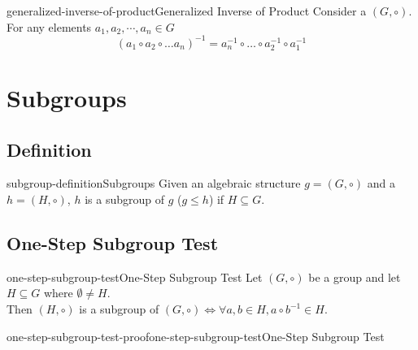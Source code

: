 \documentclass[preview]{standalone}
\begin{document}
\begin{snippettheorem}{generalized-inverse-of-product}{Generalized Inverse of Product}
    Consider a \group \((G, \circ)\). For any elements \(a_1,a_2,\cdots,a_n \in G\)
    \[
        (a_1 \circ a_2 \circ \dots a_n)^{-1}
        = a_n^{-1} \circ \dots \circ a_2^{-1} \circ a_1^{-1}
    \]
\end{snippettheorem}

\section{Subgroups}

\subsection{Definition}

\begin{snippetdefinition}{subgroup-definition}{Subgroups}
    Given an algebraic structure \(g=(G, \circ)\) and a \group \(h=(H, \circ)\), \(h\)
    is a subgroup of \(g\) (\(g \leq h\)) if \(H \subseteq G\).
\end{snippetdefinition}

\subsection{One-Step Subgroup Test}

\begin{snippettheorem}{one-step-subgroup-test}{One-Step Subgroup Test}
    Let \((G, \circ)\) be a group and let \(H \subseteq G\) where \(\emptyset \neq H\).\\
    Then \((H, \circ)\) is a subgroup of \((G, \circ) \iff
    \forall a,b \in H, a \circ b^{-1} \in H\).
\end{snippettheorem}

\begin{snippetproof}{one-step-subgroup-test-proof}{one-step-subgroup-test}{One-Step Subgroup Test}
\end{snippetproof}
\end{document}
